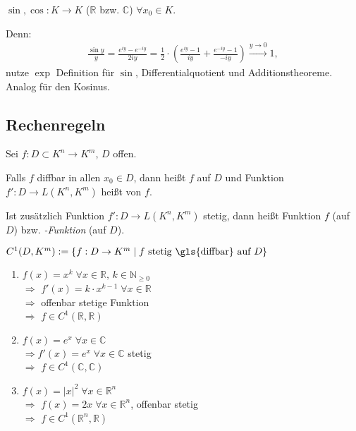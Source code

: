 \begin{example}
	$\sin, \cos: K\to K$ ($\mathbb{R}$ bzw. $\mathbb{C}$) $\forall x_0\in K$.
	
	Denn:{\zeroAmsmathAlignVSpaces
	\begin{align*}
		 \frac{\sin y}{y} = \frac{e^{iy} - e^{-iy}}{2iy} = \frac{1}{2}\cdot \left( \frac{e^{iy} - 1}{iy} + \frac{e^{-iy} - 1}{-iy} \right) \xrightarrow{y\to 0} 1,
	\end{align*}}
	nutze $\exp$ Definition für $\sin$, Differentialquotient und Additionstheoreme. Analog für den Kosinus.
\end{example}

\subsection{Rechenregeln}
\begin{*definition}
	Sei $f:D\subset K^n \to K^m$, $D$ offen.
	
	Falls $f$  \gls{diffbar} in allen $x_0\in D$, dann heißt $f$  auf $D$ und Funktion $f':D\to L(K^n, K^m)$ heißt  von $f$.
	
	Ist zusätzlich Funktion $f': D\to L(K^n, K^m)$ stetig, dann heißt Funktion $f$  (auf $D$) bzw. \emph{-Funktion} (auf $D$).
	
	$C^1(D, K^m):= \left\lbrace f: D\to K^m \mid f \text{ stetig  \gls{diffbar} auf } D \right\rbrace$
\end{*definition}

\begin{example}
	\begin{enumerate}[label={\alph*)}]
		\item $f(x) = x^k\;\forall x\in\mathbb{R},\, k\in\mathbb{N}_{\ge 0}$ \\
		$\Rightarrow$ $f'(x) = k\cdot x^{k-1}\;\forall x\in \mathbb{R}$ \\
		$\Rightarrow$ offenbar stetige Funktion \\ $\Rightarrow$ $f\in C^1(\mathbb{R}, \mathbb{R})$
		
		\item $f(x) = e^x\;\forall x\in\mathbb{C}$ \\
		$\Rightarrow f'(x) = e^x \;\forall x\in\mathbb{C}$ stetig \\
		$\Rightarrow$ $f\in C^1(\mathbb{C},\mathbb{C})$
		
		\item $f(x) = \vert x \vert^2\;\forall x\in\mathbb{R}^n$ \\
		$\Rightarrow$ $f(x) = 2x\;\forall x\in\mathbb{R}^n$, offenbar stetig \\
		$\Rightarrow$ $f\in C^1(\mathbb{R}^n, \mathbb{R})$
	\end{enumerate}
\end{example}

